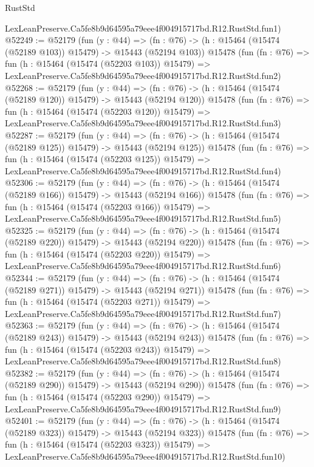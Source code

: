 \begin{lexlean}{RustStd}
\begin{coremodule}
    LexLeanPreserve.Ca5fe8b9d64595a79eee4f004915717bd.R12.RustStd.fun1)
@52249 := @52179
    (fun (y : @44) =>
    (fn : @76) -> (h : @15464 (@15474 (@52189 @103)) @15479) -> @15443 (@52194 @103))
    @15478
    (fun (fn : @76) =>
    fun (h : @15464 (@15474 (@52203 @103)) @15479) =>
    LexLeanPreserve.Ca5fe8b9d64595a79eee4f004915717bd.R12.RustStd.fun2)
@52268 := @52179
    (fun (y : @44) =>
    (fn : @76) -> (h : @15464 (@15474 (@52189 @120)) @15479) -> @15443 (@52194 @120))
    @15478
    (fun (fn : @76) =>
    fun (h : @15464 (@15474 (@52203 @120)) @15479) =>
    LexLeanPreserve.Ca5fe8b9d64595a79eee4f004915717bd.R12.RustStd.fun3)
@52287 := @52179
    (fun (y : @44) =>
    (fn : @76) -> (h : @15464 (@15474 (@52189 @125)) @15479) -> @15443 (@52194 @125))
    @15478
    (fun (fn : @76) =>
    fun (h : @15464 (@15474 (@52203 @125)) @15479) =>
    LexLeanPreserve.Ca5fe8b9d64595a79eee4f004915717bd.R12.RustStd.fun4)
@52306 := @52179
    (fun (y : @44) =>
    (fn : @76) -> (h : @15464 (@15474 (@52189 @166)) @15479) -> @15443 (@52194 @166))
    @15478
    (fun (fn : @76) =>
    fun (h : @15464 (@15474 (@52203 @166)) @15479) =>
    LexLeanPreserve.Ca5fe8b9d64595a79eee4f004915717bd.R12.RustStd.fun5)
@52325 := @52179
    (fun (y : @44) =>
    (fn : @76) -> (h : @15464 (@15474 (@52189 @220)) @15479) -> @15443 (@52194 @220))
    @15478
    (fun (fn : @76) =>
    fun (h : @15464 (@15474 (@52203 @220)) @15479) =>
    LexLeanPreserve.Ca5fe8b9d64595a79eee4f004915717bd.R12.RustStd.fun6)
@52344 := @52179
    (fun (y : @44) =>
    (fn : @76) -> (h : @15464 (@15474 (@52189 @271)) @15479) -> @15443 (@52194 @271))
    @15478
    (fun (fn : @76) =>
    fun (h : @15464 (@15474 (@52203 @271)) @15479) =>
    LexLeanPreserve.Ca5fe8b9d64595a79eee4f004915717bd.R12.RustStd.fun7)
@52363 := @52179
    (fun (y : @44) =>
    (fn : @76) -> (h : @15464 (@15474 (@52189 @243)) @15479) -> @15443 (@52194 @243))
    @15478
    (fun (fn : @76) =>
    fun (h : @15464 (@15474 (@52203 @243)) @15479) =>
    LexLeanPreserve.Ca5fe8b9d64595a79eee4f004915717bd.R12.RustStd.fun8)
@52382 := @52179
    (fun (y : @44) =>
    (fn : @76) -> (h : @15464 (@15474 (@52189 @290)) @15479) -> @15443 (@52194 @290))
    @15478
    (fun (fn : @76) =>
    fun (h : @15464 (@15474 (@52203 @290)) @15479) =>
    LexLeanPreserve.Ca5fe8b9d64595a79eee4f004915717bd.R12.RustStd.fun9)
@52401 := @52179
    (fun (y : @44) =>
    (fn : @76) -> (h : @15464 (@15474 (@52189 @323)) @15479) -> @15443 (@52194 @323))
    @15478
    (fun (fn : @76) =>
    fun (h : @15464 (@15474 (@52203 @323)) @15479) =>
    LexLeanPreserve.Ca5fe8b9d64595a79eee4f004915717bd.R12.RustStd.fun10)

\end{coremodule}
\end{lexlean}
